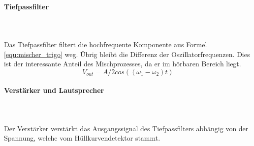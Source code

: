 \paragraph{Tiefpassfilter}\mbox{}\\ 
\\Das Tiefpassfilter filtert die hochfrequente Komponente aus Formel \ref{equ:mischer_trigo} weg. Übrig bleibt die Differenz der Oszillatorfrequenzen. Dies ist der interessante Anteil des Mischprozesses, da er im hörbaren Bereich liegt.
\begin{equation}
V_{out} = A/2cos((\omega_{1}-\omega_{2})t) 
\label{equ:mischer_gefilt}
\end{equation}

\paragraph{Verstärker und  Lautsprecher}\mbox{}\\ 
\\Der Verstärker verstärkt das Ausgangssignal des Tiefpassfilters abhängig von der Spannung, welche vom Hüllkurvendetektor stammt.
